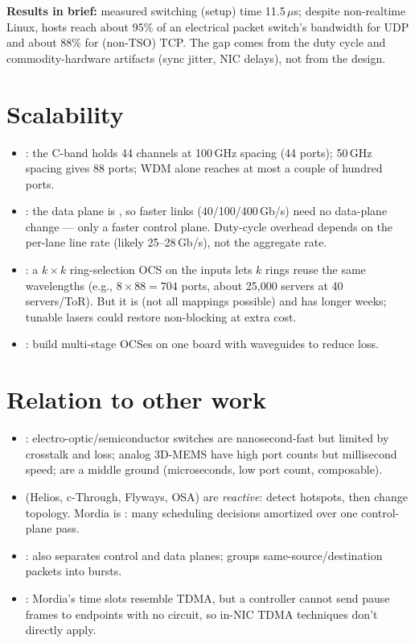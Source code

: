 \textbf{Results in brief:} measured switching (setup) time 11.5\,$\mu$s; despite non-realtime Linux, hosts reach about 95\% of an electrical packet switch's bandwidth for UDP and about 88\% for (non-TSO) TCP. The gap comes from the duty cycle and commodity-hardware artifacts (sync jitter, NIC delays), not from the design.

\section{Scalability}
\begin{itemize}
\item {}: the C-band holds 44 channels at 100\,GHz spacing (44 ports); 50\,GHz spacing gives 88 ports; WDM alone reaches at most a couple of hundred ports.
\item {}: the data plane is , so faster links (40/100/400\,Gb/s) need no data-plane change --- only a faster control plane. Duty-cycle overhead depends on the per-lane line rate (likely 25--28\,Gb/s), not the aggregate rate.
\item {}: a $k\times k$ ring-selection OCS on the inputs lets $k$ rings reuse the same wavelengths (e.g., $8\times 88 = 704$ ports, about 25{,}000 servers at 40 servers/ToR). But it is  (not all mappings possible) and has longer weeks; tunable lasers could restore non-blocking at extra cost.
\item {}: build multi-stage OCSes on one board with waveguides to reduce loss.
\end{itemize}

\section{Relation to other work}
\begin{itemize}
\item {}: electro-optic/semiconductor switches are nanosecond-fast but limited by crosstalk and loss; analog 3D-MEMS have high port counts but millisecond speed;  are a middle ground (microseconds, low port count, composable).
\item {} (Helios, c-Through, Flyways, OSA) are \emph{reactive}: detect hotspots, then change topology. Mordia is : many scheduling decisions amortized over one control-plane pass.
\item {}: also separates control and data planes; groups same-source/destination packets into bursts.
\item {}: Mordia's time slots resemble TDMA, but a controller cannot send pause frames to endpoints with no circuit, so in-NIC TDMA techniques don't directly apply.
\end{itemize}

